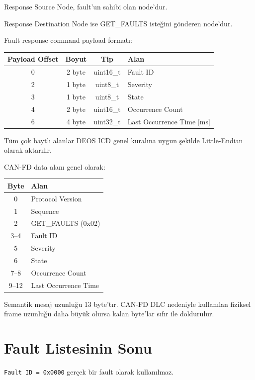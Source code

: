 \documentclass[a4paper,11pt]{article}
\begin{document}
Response Source Node, fault'un sahibi olan node'dur.

Response Destination Node ise GET\_FAULTS isteğini gönderen node'dur.

Fault response command payload formatı:

\begin{center}
\begin{tabular}{c c c l}
\toprule
\textbf{Payload Offset} &
\textbf{Boyut} &
\textbf{Tip} &
\textbf{Alan} \\
\midrule
0 & 2 byte & uint16\_t & Fault ID \\
2 & 1 byte & uint8\_t  & Severity \\
3 & 1 byte & uint8\_t  & State \\
4 & 2 byte & uint16\_t & Occurrence Count \\
6 & 4 byte & uint32\_t & Last Occurrence Time [ms] \\
\bottomrule
\end{tabular}
\end{center}

Tüm çok baytlı alanlar DEOS ICD genel kuralına uygun şekilde
Little-Endian olarak aktarılır.

CAN-FD data alanı genel olarak:

\begin{center}
\begin{tabular}{c l}
\toprule
\textbf{Byte} & \textbf{Alan} \\
\midrule
0 & Protocol Version \\
1 & Sequence \\
2 & GET\_FAULTS (0x02) \\
3--4 & Fault ID \\
5 & Severity \\
6 & State \\
7--8 & Occurrence Count \\
9--12 & Last Occurrence Time \\
\bottomrule
\end{tabular}
\end{center}

Semantik mesaj uzunluğu 13 byte'tır.
CAN-FD DLC nedeniyle kullanılan fiziksel frame uzunluğu daha büyük
olursa kalan byte'lar sıfır ile doldurulur.

\section{Fault Listesinin Sonu}

\texttt{Fault ID = 0x0000} gerçek bir fault olarak kullanılmaz.
\end{document}
